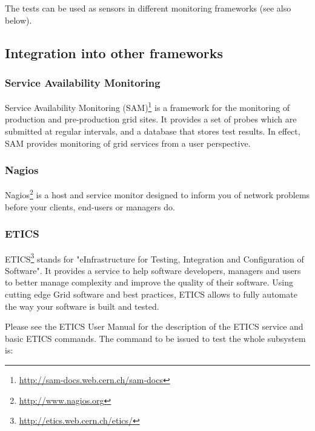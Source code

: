 The tests can be used as sensors in different monitoring frameworks
(see also below).




\subsection{Integration into other frameworks}

\subsubsection{Service Availability Monitoring}

Service Availability Monitoring
(SAM)\footnote{\url{http://sam-docs.web.cern.ch/sam-docs}} is a framework for
the monitoring of production and pre-production grid sites. It provides a set
of probes which are submitted at regular intervals, and a database that stores
test results. In effect, SAM provides monitoring of grid services from a user
perspective.



\subsubsection{Nagios}

Nagios\footnote{\url{http://www.nagios.org}} is a host and service monitor
designed to inform you of network problems before your clients, end-users or
managers do.



\subsubsection{ETICS}

ETICS\footnote{\url{http://etics.web.cern.ch/etics/}} stands for
"eInfrastructure for Testing, Integration and Configuration of Software". It
provides a service to help software developers, managers and users to better
manage complexity and improve the quality of their software. Using cutting
edge Grid software and best practices, ETICS allows to fully automate
the way your software is built and tested.

Please see the ETICS User Manual \cite{etics_manual} for the description
of the ETICS service and basic ETICS commands. The command to be issued to
test the whole \LB subsystem is:

